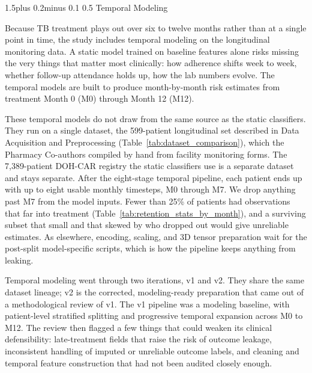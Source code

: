 \documentclass[12pt]{article}
\makeatletter
\renewcommand{\_}{\textunderscore\allowbreak}
\renewcommand{\subsection}{\@startsection{subsection}{2}{0pt}%
  {1.5\baselineskip plus 0.2\baselineskip minus 0.1\baselineskip}%
  {0.5\baselineskip}%
  {\bfseries\normalsize}}
\makeatother
\begin{document}
\subsection{Temporal Modeling}

Because TB treatment plays out over six to twelve months rather than at a single point in time, the study includes temporal modeling on the longitudinal monitoring data. A static model trained on baseline features alone risks missing the very things that matter most clinically: how adherence shifts week to week, whether follow-up attendance holds up, how the lab numbers evolve. The temporal models are built to produce month-by-month risk estimates from treatment Month 0 (M0) through Month 12 (M12).

These temporal models do not draw from the same source as the static classifiers. They run on a single dataset, the 599-patient longitudinal set described in Data Acquisition and Preprocessing (Table~\ref{tab:dataset_comparison}), which the Pharmacy Co-authors compiled by hand from facility monitoring forms. The 7,389-patient DOH-CAR registry the static classifiers use is a separate dataset and stays separate. After the eight-stage temporal pipeline, each patient ends up with up to eight usable monthly timesteps, M0 through M7. We drop anything past M7 from the model inputs. Fewer than 25\% of patients had observations that far into treatment (Table~\ref{tab:retention_stats_by_month}), and a surviving subset that small and that skewed by who dropped out would give unreliable estimates. As elsewhere, encoding, scaling, and 3D tensor preparation wait for the post-split model-specific scripts, which is how the pipeline keeps anything from leaking.

Temporal modeling went through two iterations, v1 and v2. They share the same dataset lineage; v2 is the corrected, modeling-ready preparation that came out of a methodological review of v1. The v1 pipeline was a modeling baseline, with patient-level stratified splitting and progressive temporal expansion across M0 to M12. The review then flagged a few things that could weaken its clinical defensibility: late-treatment fields that raise the risk of outcome leakage, inconsistent handling of imputed or unreliable outcome labels, and cleaning and temporal feature construction that had not been audited closely enough.
\end{document}

